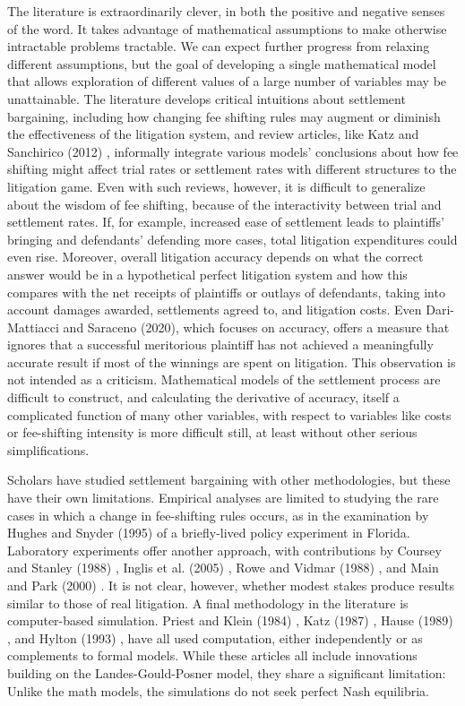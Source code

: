 \documentclass{article}
\begin{document}
The literature is extraordinarily clever, in both the positive and negative senses of the word. It takes advantage of mathematical assumptions to make otherwise intractable problems tractable. We can expect further progress from relaxing different assumptions, but the goal of developing a single mathematical model that allows exploration of different values of a large number of variables may be unattainable. The literature develops critical intuitions about settlement bargaining, including how changing fee shifting rules may augment or diminish the effectiveness of the litigation system, and review articles, like Katz and Sanchirico (2012) \cite{katzsanchirico}, informally integrate various models' conclusions about how fee shifting might affect trial rates or settlement rates with different structures to the litigation game. Even with such reviews, however, it is difficult to generalize about the wisdom of fee shifting, because of the interactivity between trial and settlement rates. If, for example, increased ease of settlement leads to plaintiffs' bringing and defendants' defending more cases, total litigation expenditures could even rise. Moreover, overall litigation accuracy depends on what the correct answer would be in a hypothetical perfect litigation system and how this compares with the net receipts of plaintiffs or outlays of defendants, taking into account damages awarded, settlements agreed to, and litigation costs. Even Dari-Mattiacci and Saraceno (2020), which focuses on accuracy, offers a measure that ignores that a successful meritorious plaintiff has not achieved a meaningfully accurate result if most of the winnings are spent on litigation. This observation is not intended as a criticism. Mathematical models of the settlement process are difficult to construct, and calculating the derivative of accuracy, itself a complicated function of many other variables, with respect to variables like costs or fee-shifting intensity is more difficult still, at least without other serious simplifications.

Scholars have studied settlement bargaining with other methodologies, but these have their own limitations. Empirical analyses are limited to studying the rare cases in which a change in fee-shifting rules occurs, as in the examination by Hughes and Snyder (1995) \cite{hughessnyder} of a briefly-lived policy experiment in Florida. Laboratory experiments offer another approach, with contributions by Coursey and Stanley (1988) \cite{courseystanley}, Inglis et al. (2005) \cite{inglisetal},  Rowe and Vidmar (1988) \cite{rowevidmar}, and Main and Park (2000) \cite{mainpark}. It is not clear, however, whether modest stakes produce results similar to those of real litigation. A final methodology in the literature is computer-based simulation. Priest and Klein (1984) \cite{priestklein}, Katz (1987) \cite{katz}, Hause (1989) \cite{hause}, and Hylton (1993) \cite{hylton}, have all used computation, either independently or as complements to formal models. While these articles all include innovations building on the Landes-Gould-Posner model, they share a significant limitation: Unlike the math models, the simulations do not seek perfect Nash equilibria.
\end{document}
